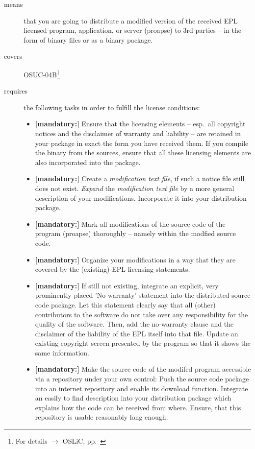 \begin{description}
\item[means] that you are going to distribute a modified version of the received
EPL licensed pro\-gram, application, or server (proapse) to 3rd parties -- in
the form of binary files or as a binary package.
\item[covers] OSUC-04B\footnote{For details $\rightarrow$ OSLiC, pp.\
\pageref{OSUC-04B-DEF}}
\item[requires] the following tasks in order to fulfill the license conditions:
\begin{itemize}

  \item \textbf{[mandatory:]} Ensure that the licensing elements -- esp.\ all
  copyright notices and the disclaimer of warranty and liability -- are retained
  in your package in exact the form you have received them. If you compile the
  binary from the sources, ensure that all these licensing elements are also
  incorporated into the package.

  \item \textbf{[mandatory:]} Create a \emph{modification text file}, if such a
  notice file still does not exist. \emph{Expand} the \emph{modification text
  file} by a more general description of your modifications. Incorporate it into
  your distribution package.

  \item \textbf{[mandatory:]} Mark all modifications of the source code of the
  program (proapse) thoroughly -- namely within the
  modfied source code.
  
  \item \textbf{[mandatory:]} Organize your modifications in a way that they are
  covered by the (existing) EPL licensing statements.

  \item \textbf{[mandatory:]} If still not existing, integrate an explicit, very
  prominently placed 'No warranty' statement into the distributed source code
  package. Let this statement clearly say that all (other) contributors to the
  software do not take over any responsibility for the quality of the software.
  Then, add the no-warranty clause and the disclaimer of the liability of the
  EPL itself into that file. Update an existing copyright screen presented by
  the program so that it shows the same information.

  \item \textbf{[mandatory:]} Make the source code of the modifed program
  accessible via a repository under your own control: Push the source code
  package into an internet repository and enable its download function.
  Integrate an easily to find description into your distribution package which
  explains how the code can be received from where. Ensure, that this repository
  is usable reasonably long enough.
  

\end{itemize}
\end{description}
